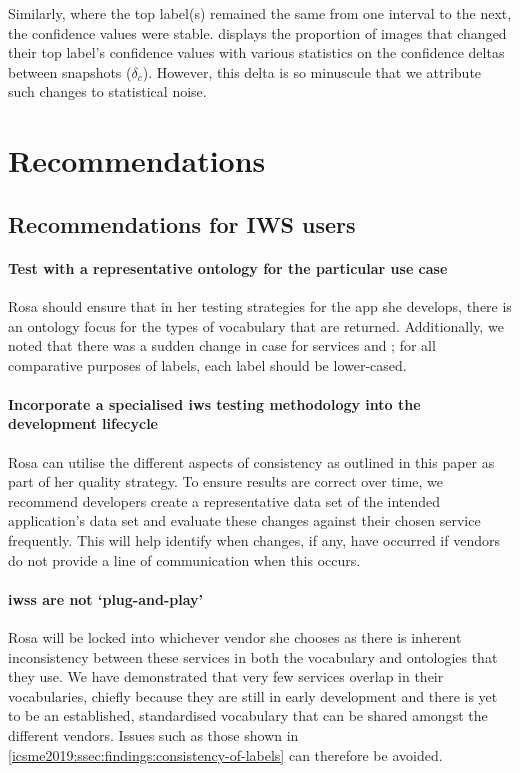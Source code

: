 Similarly, where the top label(s) remained the same from one interval to the next, the confidence values were stable.  displays the proportion of images that changed their top label's confidence values with various statistics on the confidence deltas between snapshots ($\delta_{c}$). However, this delta is so minuscule that we attribute such changes to statistical noise.

\section{Recommendations}
\label{icsme2019:sec:recommendations}

\subsection{Recommendations for IWS users}

\paragraph{Test with a representative ontology for the particular use case}
Rosa should ensure that in her testing strategies for the app she develops, there is an ontology focus for the types of vocabulary that are returned. Additionally, we noted that there was a sudden change in case for services \googleapi{} and \awsapi{}; for all comparative purposes of labels, each label should be lower-cased. 

\paragraph{Incorporate a specialised \gls{iws} testing methodology into the development lifecycle}
Rosa can utilise the different aspects of consistency as outlined in this paper as part of her quality strategy. To ensure results are correct over time, we recommend developers create a representative data set of the intended application's data set and evaluate these changes against their chosen service frequently. This will help identify when changes, if any, have occurred if vendors do not provide a line of communication when this occurs.

\paragraph{\glspl{iws} are not `plug-and-play'}
Rosa will be locked into whichever vendor she chooses as there is inherent inconsistency between these services in both the vocabulary and ontologies that they use. We have demonstrated that very few services overlap in their vocabularies, chiefly because they are still in early development and there is yet to be an established, standardised vocabulary that can be shared amongst the different vendors.
 Issues such as those shown in \cref{icsme2019:ssec:findings:consistency-of-labels} can therefore be avoided.
 
